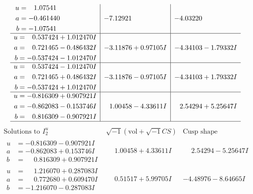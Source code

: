 \documentclass[1p]{elsarticle_modified}
\theoremstyle{definition}
\newcommand{\I}{\sqrt{-1}}
\begin{document}
$$\begin{array}{c|c|c}
\begin{aligned}
u &= \phantom{-}1.07541\phantom{ +0.000000I} \\
a &= -0.461440\phantom{ +0.000000I} \\
b &= -1.07541\phantom{ +0.000000I}\end{aligned}
 & -7.12921\phantom{ +0.000000I} & -4.03220\phantom{ +0.000000I} \\ \hline\begin{aligned}
u &= \phantom{-}0.537424 + 1.012470 I \\
a &= \phantom{-}0.721465 - 0.486432 I \\
b &= -0.537424 - 1.012470 I\end{aligned}
 & -3.11876 + 0.97105 I & -4.34103 - 1.79332 I \\ \hline\begin{aligned}
u &= \phantom{-}0.537424 - 1.012470 I \\
a &= \phantom{-}0.721465 + 0.486432 I \\
b &= -0.537424 + 1.012470 I\end{aligned}
 & -3.11876 - 0.97105 I & -4.34103 + 1.79332 I \\ \hline\begin{aligned}
u &= -0.816309 + 0.907921 I \\
a &= -0.862083 - 0.153746 I \\
b &= \phantom{-}0.816309 - 0.907921 I\end{aligned}
 & \phantom{-}1.00458 - 4.33611 I & \phantom{-}2.54294 + 5.25647 I\\
 \hline 
 \end{array}$$\newpage$$\begin{array}{c|c|c}  
\text{Solutions to }I^u_{2}& \I (\text{vol} + \sqrt{-1}CS) & \text{Cusp shape}\\
 \hline 
\begin{aligned}
u &= -0.816309 - 0.907921 I \\
a &= -0.862083 + 0.153746 I \\
b &= \phantom{-}0.816309 + 0.907921 I\end{aligned}
 & \phantom{-}1.00458 + 4.33611 I & \phantom{-}2.54294 - 5.25647 I \\ \hline\begin{aligned}
u &= \phantom{-}1.216070 + 0.287083 I \\
a &= \phantom{-}0.772680 + 0.609470 I \\
b &= -1.216070 - 0.287083 I\end{aligned}
 & \phantom{-}0.51517 + 5.99705 I & -4.48976 - 8.64665 I \\ \hline\begin{aligned}

\end{aligned}
\end{array}$$
\end{document}
